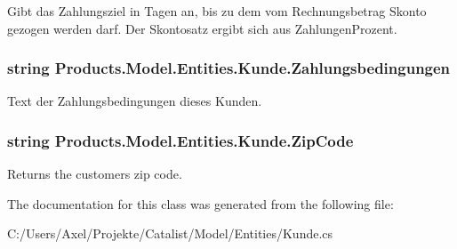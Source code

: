 Gibt das Zahlungsziel in Tagen an, bis zu dem vom Rechnungsbetrag Skonto gezogen werden darf. Der Skontosatz ergibt sich aus Zahlungen\+Prozent. 

\subsubsection[{\texorpdfstring{Zahlungsbedingungen}{Zahlungsbedingungen}}]{\setlength{\rightskip}{0pt plus 5cm}string Products.\+Model.\+Entities.\+Kunde.\+Zahlungsbedingungen\hspace{0.3cm}{\ttfamily [get]}}\hypertarget{class_products_1_1_model_1_1_entities_1_1_kunde_ae4ed6da8d25622d1e1a6fecb1c8095e2}{}\label{class_products_1_1_model_1_1_entities_1_1_kunde_ae4ed6da8d25622d1e1a6fecb1c8095e2}


Text der Zahlungsbedingungen dieses Kunden. 

\subsubsection[{\texorpdfstring{Zip\+Code}{ZipCode}}]{\setlength{\rightskip}{0pt plus 5cm}string Products.\+Model.\+Entities.\+Kunde.\+Zip\+Code\hspace{0.3cm}{\ttfamily [get]}}\hypertarget{class_products_1_1_model_1_1_entities_1_1_kunde_aa6bf1bacab6e3cce382a1c1d197219ec}{}\label{class_products_1_1_model_1_1_entities_1_1_kunde_aa6bf1bacab6e3cce382a1c1d197219ec}


Returns the customer\textquotesingle{}s zip code. 



The documentation for this class was generated from the following file\+:\begin{DoxyCompactItemize}
\item 
C\+:/\+Users/\+Axel/\+Projekte/\+Catalist/\+Model/\+Entities/Kunde.\+cs\end{DoxyCompactItemize}
